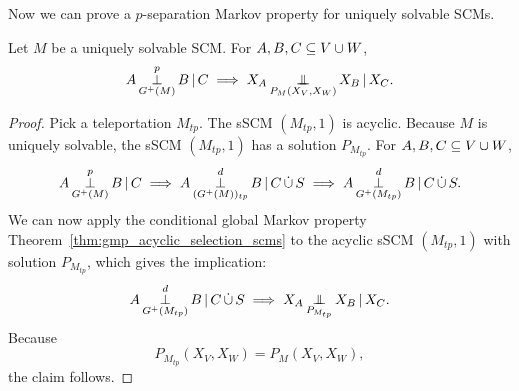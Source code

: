 Now we can prove a $p$-separation Markov property for uniquely solvable SCMs.
\begin{Cor}
  Let $M$ be a uniquely solvable SCM.
  For $A,B,C \subseteq V \cup W$,
  $$A \operatorname*{\perp}_{G^+(M)}^p B \operatorname*{|} C \implies X_A \operatorname*{\perp\mkern-11mu\perp}_{P_M(X_V,X_W)} X_B \operatorname*{|} X_C.$$
\end{Cor}
\begin{proof}
  Pick a teleportation $M_{tp}$.
  The sSCM $(M_{tp},1)$ is acyclic.
  Because $M$ is uniquely solvable, the sSCM $(M_{tp},1)$ has a solution $P_{M_{tp}}$.
  For $A,B,C \subseteq V \cup W$,
  $$A \operatorname*{\perp}_{G^+(M)}^p B \operatorname*{|} C \implies A \operatorname*{\perp}_{(G^+(M))_{tp}}^d B \operatorname*{|} C \,\dot{\cup}\, S \implies A \operatorname*{\perp}_{G^+(M_{tp})}^d B \operatorname*{|} C \,\dot{\cup}\, S.$$
  We can now apply the conditional global Markov property Theorem~\ref{thm:gmp_acyclic_selection_scms} to the acyclic sSCM $(M_{tp},1)$ with solution $P_{M_{tp}}$, which gives the implication:
  $$A \operatorname*{\perp}_{G^+(M_{tp})}^d B \operatorname*{|} C \,\dot{\cup}\, S \implies X_A \operatorname*{\perp\mkern-11mu\perp}_{P_{M_{tp}}} X_B \operatorname*{|} X_C.$$
  Because
  $$P_{M_{tp}}(X_V,X_W) = P_M(X_V,X_W),$$
  the claim follows.
\end{proof}
